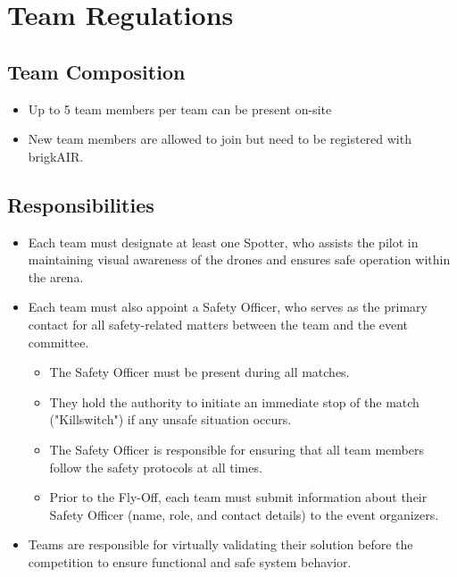 
\section{Team Regulations}

\subsection{Team Composition}
\begin{itemize}
	\item{Up to 5 team members per team can be present on-site}
	\item{New team members are allowed to join but need to be registered with brigkAIR.}
\end{itemize}

\subsection{Responsibilities}
\begin{itemize}
	\item{Each team must designate at least one Spotter, who assists the pilot in maintaining visual awareness of the drones and ensures safe operation within the arena.}
	\item{Each team must also appoint a Safety Officer, who serves as the primary contact for all safety-related matters between the team and the event committee.}
	\begin{itemize}[label=--]
		\item{The Safety Officer must be present during all matches.}
		\item{They hold the authority to initiate an immediate stop of the match ("Killswitch") if any unsafe situation occurs.}
		\item{The Safety Officer is responsible for ensuring that all team members follow the safety protocols at all times.}
		\item{Prior to the Fly-Off, each team must submit information about their Safety Officer (name, role, and contact details) to the event organizers.}
	\end{itemize}
	\item{Teams are responsible for virtually validating their solution before the competition to ensure functional and safe system behavior.}
\end{itemize}

